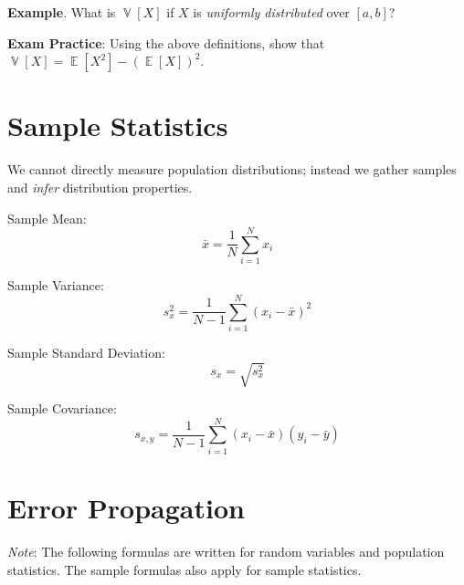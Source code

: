 \documentclass[12pt,twoside]{article}
\DeclareMathOperator{\EX}{\mathbb{E}}%
\DeclareMathOperator{\VR}{\mathbb{V}}%
\begin{document}
\textbf{Example}. What is $\VR[X]$ if $X$ is \emph{uniformly distributed} over $[a, b]$?

\vfill

\textbf{Exam Practice}: Using the above definitions, show that $\VR[X] = \EX[X^2] - (\EX[X])^2$.

\pagebreak

\section{Sample Statistics}

We cannot directly measure population distributions; instead we gather samples and \emph{infer} distribution properties. \\

\begin{minipage}{0.48\textwidth}
Sample Mean:
\begin{equation}
	\bar{x} = \frac{1}{N} \sum_{i=1}^{N} x_i
\end{equation}
\end{minipage} \quad
\begin{minipage}{0.48\textwidth}
Sample Variance:
\begin{equation}
	s^2_x = \frac{1}{N-1}\sum_{i=1}^{N}(x_i - \bar{x})^2
\end{equation}
\end{minipage}

\vspace{12pt}

\begin{minipage}{0.48\textwidth}
Sample Standard Deviation:
\begin{equation}
	s_x = \sqrt{s_x^2}
\end{equation}
\end{minipage} \quad
\begin{minipage}{0.48\textwidth}
Sample Covariance:
\begin{equation}
	s_{x,y} = \frac{1}{N-1}\sum_{i=1}^{N}(x_i - \bar{x})(y_i - \bar{y})
\end{equation}
\end{minipage}

\section{Error Propagation}

\emph{Note}: The following formulas are written for random variables and population statistics. The sample formulas also apply for sample statistics. \\
\end{document}
